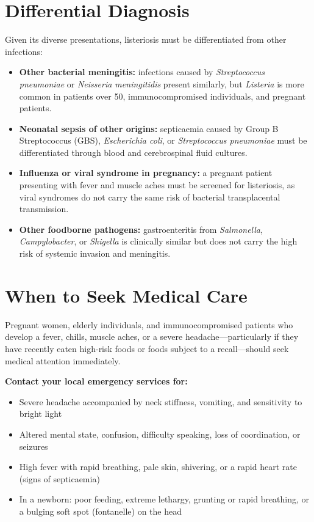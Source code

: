 \section*{Differential Diagnosis}
Given its diverse presentations, listeriosis must be differentiated from other infections:
\begin{itemize}
    \item \textbf{Other bacterial meningitis:} infections caused by \textit{Streptococcus pneumoniae} or \textit{Neisseria meningitidis} present similarly, but \textit{Listeria} is more common in patients over 50, immunocompromised individuals, and pregnant patients.
    \item \textbf{Neonatal sepsis of other origins:} septicaemia caused by Group B Streptococcus (GBS), \textit{Escherichia coli}, or \textit{Streptococcus pneumoniae} must be differentiated through blood and cerebrospinal fluid cultures.
    \item \textbf{Influenza or viral syndrome in pregnancy:} a pregnant patient presenting with fever and muscle aches must be screened for listeriosis, as viral syndromes do not carry the same risk of bacterial transplacental transmission.
    \item \textbf{Other foodborne pathogens:} gastroenteritis from \textit{Salmonella}, \textit{Campylobacter}, or \textit{Shigella} is clinically similar but does not carry the high risk of systemic invasion and meningitis.
\end{itemize}

\section*{When to Seek Medical Care}
Pregnant women, elderly individuals, and immunocompromised patients who develop a fever, chills, muscle aches, or a severe headache—particularly if they have recently eaten high-risk foods or foods subject to a recall—should seek medical attention immediately.

\textbf{Contact your local emergency services for:}
\begin{itemize}
    \item Severe headache accompanied by neck stiffness, vomiting, and sensitivity to bright light
    \item Altered mental state, confusion, difficulty speaking, loss of coordination, or seizures
    \item High fever with rapid breathing, pale skin, shivering, or a rapid heart rate (signs of septicaemia)
    \item In a newborn: poor feeding, extreme lethargy, grunting or rapid breathing, or a bulging soft spot (fontanelle) on the head
\end{itemize}

